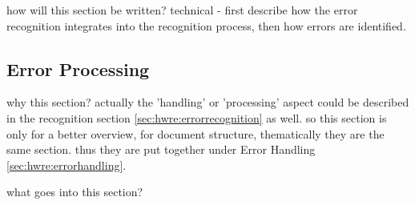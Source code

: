 how will this section be written?
technical - first describe how the error recognition integrates into the
recognition process, then how errors are identified.


\subsection{Error Processing}
\label{sec:hwre:errorprocessing}


why this section? 
actually the 'handling' or 'processing' aspect could be 
described in the recognition section \ref{sec:hwre:errorrecognition} as well.
so this section is only for a better overview, for document structure, 
thematically they are the same section. thus they are put together under
Error Handling \ref{sec:hwre:errorhandling}.

what goes into this section?

